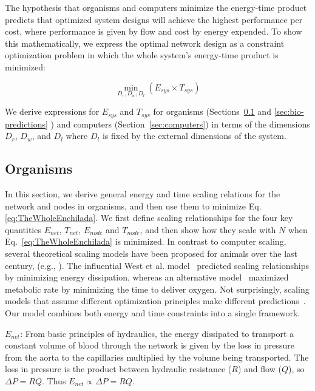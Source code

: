 \documentclass[12pt]{article}
\begin{document}
The hypothesis that organisms and computers minimize the energy-time product
predicts that optimized system designs will achieve
the highest performance per cost, where performance is given by flow and cost
by energy expended.  To show this mathematically, 
we express the optimal network design as a constraint optimization problem in
which the whole system's energy-time product is minimized:

\begin{equation}
  \min_{D_r,D_w,D_l}(E_{sys} \times T_{sys})
\label{eq:TheWholeEnchilada}
\end{equation}

\noindent We derive expressions for $E_{sys}$ and $T_{sys}$ for organisms
(Sections~\ref{sec:organisms} and \ref{sec:bio-predictions} ) and computers (Section~\ref{sec:computers}) in terms of
the dimensions $D_r$, $D_w$, and $D_l$ where $D_l$ is fixed by the external
dimensions of the system.


\subsection{Organisms}
\label{sec:organisms}

In this section, we derive general energy and time scaling relations for the
network and nodes in organisms, and then use them to minimize Eq.
\ref{eq:TheWholeEnchilada}.  We first define scaling relationships for the four
key quantities $E_{net}$, $T_{net}$, $E_{node}$ and $T_{node}$, and
then show
how they scale with $N$ when Eq.~\ref{eq:TheWholeEnchilada} is minimized.
In contrast to computer scaling, several theoretical scaling models have been proposed for animals over the last century, (e.g., \cite{thompson1942arcy, west97, banavar1999size, dodds2010optimal, banavar10}). The influential West et al. model~\cite{west97} predicted
scaling relationships by minimizing energy dissipation,
whereas an alternative model~\cite{banavar10} maximized metabolic rate by minimizing the time to deliver oxygen. Not surprisingly, scaling models that assume different optimization principles make different predictions~\cite{newberry2015testing}.  Our model
combines both energy and time constraints into a single framework.

$E_{net}$: From basic principles of hydraulics, the energy dissipated to
transport a constant volume of blood through the network is given by the loss
in pressure from the aorta to the capillaries multiplied by the volume being
transported.  The loss in pressure is the product between hydraulic resistance ($R$) and
flow ($Q$), so $\Delta P = RQ$.  Thus $E_{net} \propto \Delta P = RQ$. 
\end{document}
